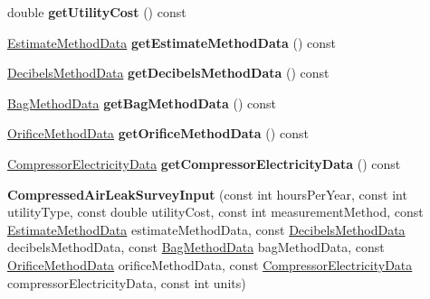 \begin{DoxyCompactItemize}
\item 
\mbox{\label{class_compressed_air_leak_survey_input_aef778b2fd835f951a24fd314da054ffe}} 
double {\bfseries get\+Utility\+Cost} () const
\item 
\mbox{\label{class_compressed_air_leak_survey_input_a46f6c8e7b71d4f53255b66f49ce9fc12}} 
\hyperlink{class_estimate_method_data}{Estimate\+Method\+Data} {\bfseries get\+Estimate\+Method\+Data} () const
\item 
\mbox{\label{class_compressed_air_leak_survey_input_ad1085ebe92eeb55a76214d272f1d024f}} 
\hyperlink{class_decibels_method_data}{Decibels\+Method\+Data} {\bfseries get\+Decibels\+Method\+Data} () const
\item 
\mbox{\label{class_compressed_air_leak_survey_input_a2bd9317c8f38903db0d013e5e54b9acf}} 
\hyperlink{class_bag_method_data}{Bag\+Method\+Data} {\bfseries get\+Bag\+Method\+Data} () const
\item 
\mbox{\label{class_compressed_air_leak_survey_input_ad4abb9606753288d97032067cd5bfba0}} 
\hyperlink{class_orifice_method_data}{Orifice\+Method\+Data} {\bfseries get\+Orifice\+Method\+Data} () const
\item 
\mbox{\label{class_compressed_air_leak_survey_input_abb548b44e689a5aae7ffe4ab3acb2234}} 
\hyperlink{class_compressor_electricity_data}{Compressor\+Electricity\+Data} {\bfseries get\+Compressor\+Electricity\+Data} () const
\item 
\mbox{\label{class_compressed_air_leak_survey_input_ad39d455788d74edeb8b285e1e6a72408}} 
{\bfseries Compressed\+Air\+Leak\+Survey\+Input} (const int hours\+Per\+Year, const int utility\+Type, const double utility\+Cost, const int measurement\+Method, const \hyperlink{class_estimate_method_data}{Estimate\+Method\+Data} estimate\+Method\+Data, const \hyperlink{class_decibels_method_data}{Decibels\+Method\+Data} decibels\+Method\+Data, const \hyperlink{class_bag_method_data}{Bag\+Method\+Data} bag\+Method\+Data, const \hyperlink{class_orifice_method_data}{Orifice\+Method\+Data} orifice\+Method\+Data, const \hyperlink{class_compressor_electricity_data}{Compressor\+Electricity\+Data} compressor\+Electricity\+Data, const int units)

\end{DoxyCompactItemize}
